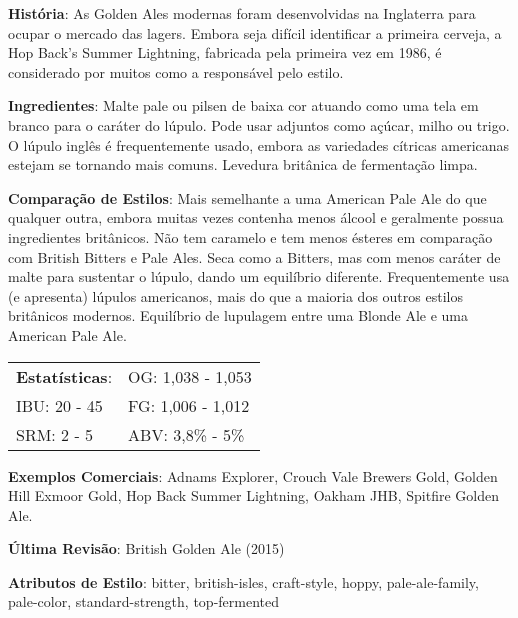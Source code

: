 \textbf{História}: As Golden Ales modernas foram desenvolvidas na Inglaterra para ocupar o mercado das lagers. Embora seja difícil identificar a primeira cerveja, a Hop Back's Summer Lightning, fabricada pela primeira vez em 1986, é considerado por muitos como a responsável pelo estilo.

\textbf{Ingredientes}: Malte pale ou pilsen de baixa cor atuando como uma tela em branco para o caráter do lúpulo. Pode usar adjuntos como açúcar, milho ou trigo. O lúpulo inglês é frequentemente usado, embora as variedades cítricas americanas estejam se tornando mais comuns. Levedura britânica de fermentação limpa.

\textbf{Comparação de Estilos}: Mais semelhante a uma American Pale Ale do que qualquer outra, embora muitas vezes contenha menos álcool e geralmente possua ingredientes britânicos. Não tem caramelo e tem menos ésteres em comparação com British Bitters e Pale Ales. Seca como a Bitters, mas com menos caráter de malte para sustentar o lúpulo, dando um equilíbrio diferente. Frequentemente usa (e apresenta) lúpulos americanos, mais do que a maioria dos outros estilos britânicos modernos. Equilíbrio de lupulagem entre uma Blonde Ale e uma American Pale Ale.

\begin{tabular}{@{}p{35mm}p{35mm}@{}}
  \textbf{Estatísticas}: & OG: 1,038 - 1,053 \\
  IBU: 20 - 45  & FG: 1,006 - 1,012  \\
  SRM: 2 - 5  & ABV: 3,8\% - 5\%
\end{tabular}

\textbf{Exemplos Comerciais}: Adnams Explorer, Crouch Vale Brewers Gold, Golden Hill Exmoor Gold, Hop Back Summer Lightning, Oakham JHB, Spitfire Golden Ale.

\textbf{Última Revisão}: British Golden Ale (2015)

\textbf{Atributos de Estilo}: bitter, british-isles, craft-style, hoppy, pale-ale-family, pale-color, standard-strength, top-fermented
